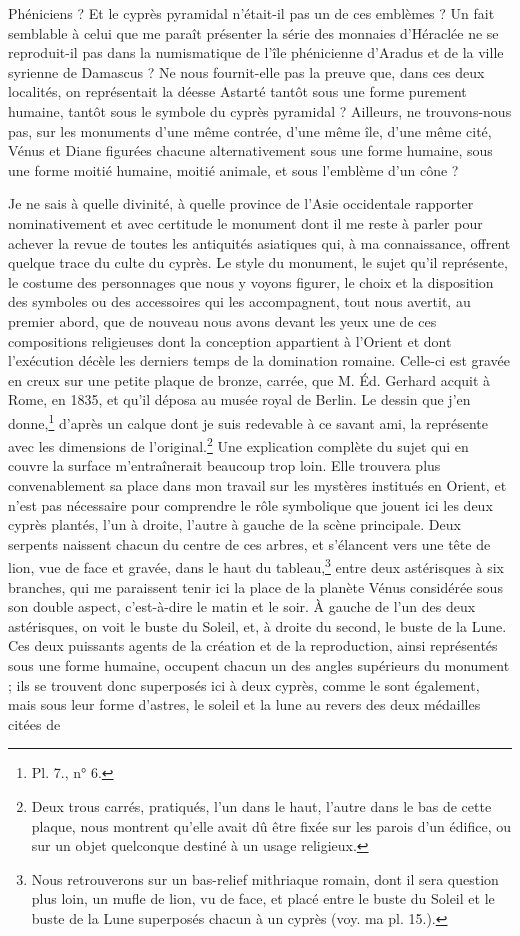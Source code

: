 \documentclass{article}
\begin{document}
Phéniciens ? Et le cyprès pyramidal n'était-il pas un de ces emblèmes ? Un fait semblable à celui que me paraît présenter la série des monnaies d'Héraclée ne se reproduit-il pas dans la numismatique de l'île phénicienne d'Aradus et de la ville syrienne de Damascus ? Ne nous fournit-elle pas la preuve que, dans ces deux localités, on représentait la déesse Astarté tantôt sous une forme purement humaine, tantôt sous le symbole du cyprès pyramidal ? Ailleurs, ne trouvons-nous pas, sur les monuments d'une même contrée, d'une même île, d'une même cité, Vénus et Diane figurées chacune alternativement sous une forme humaine, sous une forme moitié humaine, moitié animale, et sous l'emblème d'un cône ?

Je ne sais à quelle divinité, à quelle province de l'Asie occidentale rapporter nominativement et avec certitude le monument dont il me reste à parler pour achever la revue de toutes les antiquités asiatiques qui, à ma connaissance, offrent quelque trace du culte du cyprès. Le style du monument, le sujet qu'il représente, le costume des personnages que nous y voyons figurer, le choix et la disposition des symboles ou des accessoires qui les accompagnent, tout nous avertit, au premier abord, que de nouveau nous avons devant les yeux une de ces compositions religieuses dont la conception appartient à l'Orient et dont l'exécution décèle les derniers temps de la domination romaine. Celle-ci est gravée en creux sur une petite plaque de bronze, carrée, que M. Éd. Gerhard acquit à Rome, en 1835, et qu'il déposa au musée royal de Berlin. Le dessin que j'en donne,\footnote{Pl. 7., n° 6.} d'après un calque dont je suis redevable à ce savant ami, la représente avec les dimensions de l'original.\footnote{Deux trous carrés, pratiqués, l'un dans le haut, l'autre dans le bas de cette plaque, nous montrent qu'elle avait dû être fixée sur les parois d'un édifice, ou sur un objet quelconque destiné à un usage religieux.} Une explication complète du sujet qui en couvre la surface m'entraînerait beaucoup trop loin. Elle trouvera plus convenablement sa place dans mon travail sur les mystères institués en Orient, et n'est pas nécessaire pour comprendre le rôle symbolique que jouent ici les deux cyprès plantés, l'un à droite, l'autre à gauche de la scène principale. Deux serpents naissent chacun du centre de ces arbres, et s'élancent vers une tête de lion, vue de face et gravée, dans le haut du tableau,\footnote{Nous retrouverons sur un bas-relief mithriaque romain, dont il sera question plus loin, un mufle de lion, vu de face, et placé entre le buste du Soleil et le buste de la Lune superposés chacun à un cyprès (voy. ma pl. 15.).} entre deux astérisques à six branches, qui me paraissent tenir ici la place de la planète Vénus considérée sous son double aspect, c'est-à-dire le matin et le soir. À gauche de l'un des deux astérisques, on voit le buste du Soleil, et, à droite du second, le buste de la Lune. Ces deux puissants agents de la création et de la reproduction, ainsi représentés sous une forme humaine, occupent chacun un des angles supérieurs du monument ; ils se trouvent donc superposés ici à deux cyprès, comme le sont également, mais sous leur forme d'astres, le soleil et la lune au revers des deux médailles citées de 
\end{document}
